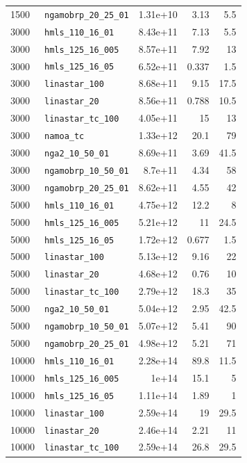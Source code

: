 \begin{longtable}{|l|l|r|r|r|}
    1500 & \texttt{ngamobrp\_20\_25\_01} & 1.31e+10 & 3.13 & 5.5 \\
    3000 & \texttt{hmls\_110\_16\_01} & 8.43e+11 & 7.13 & 5.5 \\
    3000 & \texttt{hmls\_125\_16\_005} & 8.57e+11 & 7.92 & 13 \\
    3000 & \texttt{hmls\_125\_16\_05} & 6.52e+11 & 0.337 & 1.5 \\
    3000 & \texttt{linastar\_100} & 8.68e+11 & 9.15 & 17.5 \\
    3000 & \texttt{linastar\_20} & 8.56e+11 & 0.788 & 10.5 \\
    3000 & \texttt{linastar\_tc\_100} & 4.05e+11 & 15 & 13 \\
    3000 & \texttt{namoa\_tc} & 1.33e+12 & 20.1 & 79 \\
    3000 & \texttt{nga2\_10\_50\_01} & 8.69e+11 & 3.69 & 41.5 \\
    3000 & \texttt{ngamobrp\_10\_50\_01} & 8.7e+11 & 4.34 & 58 \\
    3000 & \texttt{ngamobrp\_20\_25\_01} & 8.62e+11 & 4.55 & 42 \\
    5000 & \texttt{hmls\_110\_16\_01} & 4.75e+12 & 12.2 & 8 \\
    5000 & \texttt{hmls\_125\_16\_005} & 5.21e+12 & 11 & 24.5 \\
    5000 & \texttt{hmls\_125\_16\_05} & 1.72e+12 & 0.677 & 1.5 \\
    5000 & \texttt{linastar\_100} & 5.13e+12 & 9.16 & 22 \\
    5000 & \texttt{linastar\_20} & 4.68e+12 & 0.76 & 10 \\
    5000 & \texttt{linastar\_tc\_100} & 2.79e+12 & 18.3 & 35 \\
    5000 & \texttt{nga2\_10\_50\_01} & 5.04e+12 & 2.95 & 42.5 \\
    5000 & \texttt{ngamobrp\_10\_50\_01} & 5.07e+12 & 5.41 & 90 \\
    5000 & \texttt{ngamobrp\_20\_25\_01} & 4.98e+12 & 5.21 & 71 \\
    10000 & \texttt{hmls\_110\_16\_01} & 2.28e+14 & 89.8 & 11.5 \\
    10000 & \texttt{hmls\_125\_16\_005} & 1e+14 & 15.1 & 5 \\
    10000 & \texttt{hmls\_125\_16\_05} & 1.11e+14 & 1.89 & 1 \\
    10000 & \texttt{linastar\_100} & 2.59e+14 & 19 & 29.5 \\
    10000 & \texttt{linastar\_20} & 2.46e+14 & 2.21 & 11 \\
    10000 & \texttt{linastar\_tc\_100} & 2.59e+14 & 26.8 & 29.5 \\

\end{longtable}

